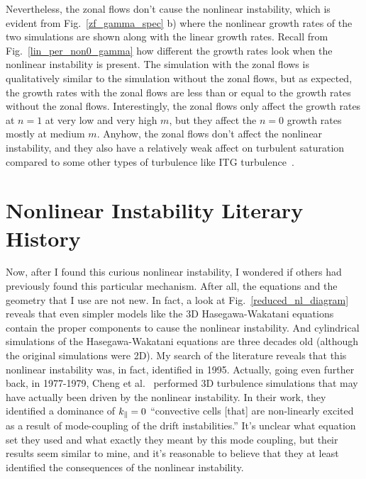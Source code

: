Nevertheless, the zonal flows don't cause the nonlinear instability, which is evident from Fig.~\ref{zf_gamma_spec} b) where the nonlinear growth rates of the two simulations are shown
along with the linear growth rates. Recall from Fig.~\ref{lin_per_non0_gamma} how different the growth rates look when the nonlinear instability is present.
The simulation with the zonal flows is qualitatively similar to the simulation without the zonal flows, but as expected, the growth rates with the zonal flows are less than or equal to
the growth rates without the zonal flows. Interestingly, the zonal flows only affect the growth rates at $n=1$ at very low and very high $m$, but they affect the $n=0$ growth rates
mostly at medium $m$. Anyhow, the zonal flows don't affect the nonlinear instability, and they also have a relatively weak affect on turbulent saturation compared to some other types
of turbulence like ITG turbulence~\cite{dimits2000,Holland2003}.


\section{Nonlinear Instability Literary History}
\label{s_nl_inst_context}

Now, after I found this curious nonlinear instability, I wondered if others had previously found this particular mechanism. 
After all, the equations and the geometry that I use are not new. In fact, a look at 
Fig.~\ref{reduced_nl_diagram} reveals that even simpler models like the 3D Hasegawa-Wakatani equations~\cite{hasegawa1983} contain the proper components to cause the nonlinear instability. And 
cylindrical simulations of the Hasegawa-Wakatani equations are three decades old (although the original simulations were 2D).
My search of the literature reveals that this nonlinear instability was, in fact, identified in 1995. Actually, going even further back, in 1977-1979, 
Cheng et al.~\cite{cheng1977,cheng1979} performed 3D turbulence simulations that may have actually been driven by the nonlinear instability. 
In their work, they identified a dominance of $k_\parallel=0$ ``convective cells [that] are non-linearly excited as a result of mode-coupling of the drift instabilities.'' 
It's unclear what equation set they used
and what exactly they meant by this mode coupling, but their results seem similar to mine, and it's reasonable to believe that they at least identified the consequences of the nonlinear instability.

